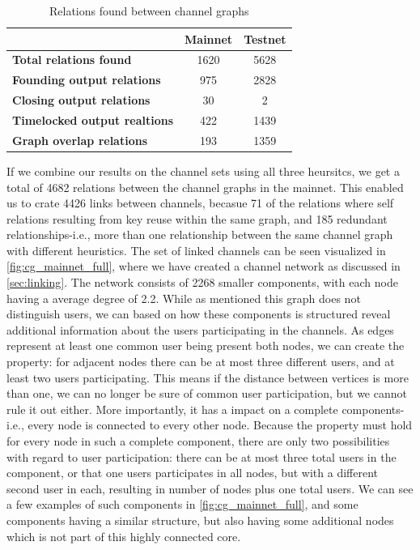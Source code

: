 \begin{table}[ht]
\centering
\caption{Relations found between channel graphs}
\label{table:connections}
\begin{tabular}{|l|c|c|}
\hline
                                       & \textbf{Mainnet} & \textbf{Testnet} \\ \hline
\textbf{Total relations found}       & 1620            & 5628             \\ \hline
\textbf{Founding output relations}   & 975               & 2828             \\ \hline
\textbf{Closing output relations}    & 30              & 2                \\ \hline
\textbf{Timelocked output realtions} & 422               & 1439             \\ \hline
\textbf{Graph overlap relations}     & 193               & 1359             \\ \hline
\end{tabular}
\end{table}

If we combine our results on the channel sets using all three heursitcs, we get a total of 4682 relations between the channel graphs in the mainnet. This enabled us to crate 4426 links between channels, becasue 71 of the relations where self relations resulting from key reuse within the same graph, and 185 redundant relationships-i.e., more than one relationship between the same channel graph with different heuristics. The set of linked channels can be seen visualized in \cref{fig:cg_mainnet_full}, where we have created a channel network as discussed in \cref{sec:linking}. The network consists of 2268 smaller components, with each node having a average degree of 2.2. While as mentioned this graph does not distinguish users, we can based on how these components is structured reveal additional information about the users participating in the channels. 
As edges represent at least one common user being present both nodes, we can create the property: for adjacent nodes there can be at most three different users, and at least two users participating. This means if the distance between vertices is more than one, we can no longer be sure of common user participation, but we cannot rule it out either. More importantly, it has a impact on a complete components-i.e., every node is connected to every other node. Because the property must hold for every node in such a complete component, there are only two possibilities with regard to user participation: there can be at most three total users in the component, or that one users participates in all nodes, but with a different second user in each, resulting in number of nodes plus one total users.
We can see a few examples of such components in \cref{fig:cg_mainnet_full}, and some components having a similar structure, but also having some additional nodes which is not part of this highly connected core.
\\

